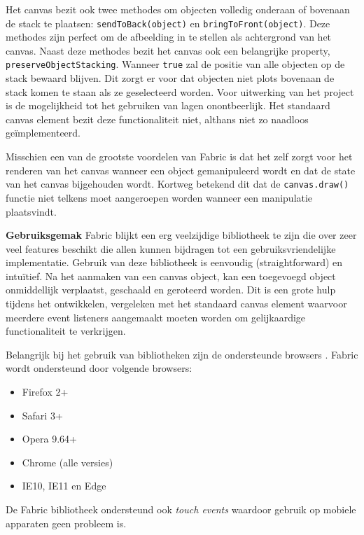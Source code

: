 
Het canvas bezit ook twee methodes om objecten volledig onderaan of bovenaan de stack te plaatsen: \lstinline{sendToBack(object)} en \lstinline{bringToFront(object)}. Deze methodes zijn perfect om de afbeelding in te stellen als achtergrond van het canvas. Naast deze methodes bezit het canvas ook een belangrijke property, \lstinline{preserveObjectStacking}. Wanneer \lstinline{true} zal de positie van alle objecten op de stack bewaard blijven. Dit zorgt er voor dat objecten niet plots bovenaan de stack komen te staan als ze geselecteerd worden. Voor uitwerking van het project is de mogelijkheid tot het gebruiken van lagen onontbeerlijk. Het standaard canvas element bezit deze functionaliteit niet, althans niet zo naadloos ge\"{i}mplementeerd. 

Misschien een van de grootste voordelen van Fabric is dat het zelf zorgt voor het renderen van het canvas wanneer een object gemanipuleerd wordt en dat de state van het canvas bijgehouden wordt. Kortweg betekend dit dat de \lstinline{canvas.draw()} functie niet telkens moet aangeroepen worden wanneer een manipulatie plaatsvindt. 

\textbf{Gebruiksgemak} \break
Fabric blijkt een erg veelzijdige bibliotheek te zijn die over zeer veel features beschikt die allen kunnen bijdragen tot een gebruiksvriendelijke implementatie. Gebruik van deze bibliotheek is eenvoudig (straightforward) en intu\"{i}tief. Na het aanmaken van een canvas object, kan een toegevoegd object onmiddellijk verplaatst, geschaald en geroteerd worden. Dit is een grote hulp tijdens het ontwikkelen, vergeleken met het standaard canvas element waarvoor meerdere event listeners aangemaakt moeten worden om gelijkaardige functionaliteit te verkrijgen. 

Belangrijk bij het gebruik van bibliotheken zijn de ondersteunde browsers \cite{Fabricsupportedbrowsers}. Fabric wordt ondersteund door volgende browsers: 
\begin{itemize}
	\item Firefox 2+
	\item Safari 3+ 
	\item Opera 9.64+
	\item Chrome (alle versies)
	\item IE10, IE11 en Edge
\end{itemize}

De Fabric bibliotheek ondersteund ook \textit{touch events} waardoor gebruik op mobiele apparaten geen probleem is. 


